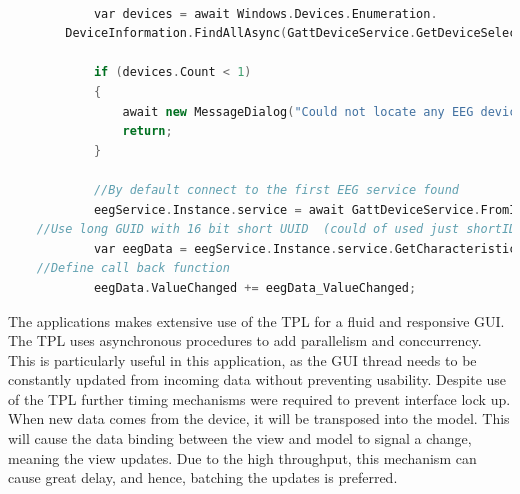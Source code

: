 \documentclass[]{article}
\begin{document}
\begin{lstlisting}[language=C++, caption=Connecting to a \ac{BLE} device's \ac{EEG} service ,label={lst:csharpeble}]

            var devices = await Windows.Devices.Enumeration.
		DeviceInformation.FindAllAsync(GattDeviceService.GetDeviceSelectorFromShortId(0xEEE0));

            if (devices.Count < 1)
            {
                await new MessageDialog("Could not locate any EEG devices in the vinicity").ShowAsync();
                return;
            }

            //By default connect to the first EEG service found
            eegService.Instance.service = await GattDeviceService.FromIdAsync(devices[0].Id);
	//Use long GUID with 16 bit short UUID  (could of used just shortID) 
            var eegData = eegService.Instance.service.GetCharacteristics(new Guid("0000EEE1-0000-1000-8000-00805f9b34fb"))[0];
	//Define call back function
            eegData.ValueChanged += eegData_ValueChanged;

\end{lstlisting}

The applications makes extensive use of the \ac{TPL} for a fluid and responsive \ac{GUI}. The \ac{TPL} uses asynchronous procedures to add parallelism and conccurrency. This is particularly useful in this application, as the \ac{GUI} thread needs to be constantly updated from incoming data without preventing usability. Despite use of the \ac{TPL} further timing mechanisms were required to prevent interface lock up. When new data comes from the device, it will be transposed into the model. This will cause the data binding between the view and model to signal a change, meaning the view updates. Due to the high throughput, this mechanism can cause great delay, and hence, batching the updates is preferred.
\end{document}

